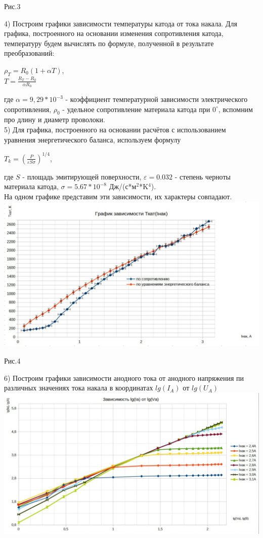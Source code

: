 \documentclass[11pt]{article}
\begin{document}
\begin{center}
Рис.3\\
\end{center}
4) Построим графики зависимости температуры катода от тока накала.  
Для графика, построенного на основании изменения сопротивления катода, температуру будем вычислять по формуле, полученной в результате преобразований:
\begin{center}
   $ \rho_T = R_0 (1 + \alpha T) $, \\
   $T = \frac{R_T - R_0}{\alpha R_0}$
\end{center}
где $\alpha = 9,29 * 10^{-3}$ - коэффициент температурной зависимости электрического сопротивления, $\rho_0$ - удельное сопротивление материала катода при $0^{\circ}$, вспомним про длину и диаметр проволоки. \\
5) Для графика, построенного на основании расчётов с использованием уравнения энергетического баланса, используем формулу 
\begin{center}
    $T_k = (\frac{P}{\varepsilon S \sigma})^{1/4}$,
\end{center}
где $S$ - площадь эмитирующей поверхности, $\varepsilon = 0.032$ - степень черноты материала катода, $\sigma = 5.67*10^{-8}$ Дж/(с*м$^2$*K$^4$). \\
На одном графике представим эти зависимости, их характеры совпадают.\\
\includegraphics[width=19cm]{g3}\\
\begin{center}
Рис.4
\end{center}
6) Построим графики зависимости анодного тока от анодного напряжения пи различных значениях тока накала в координатах $lg(I_A)$ от $lg(U_A)$\\
\includegraphics[width=19cm]{g4}\\
\end{document}
